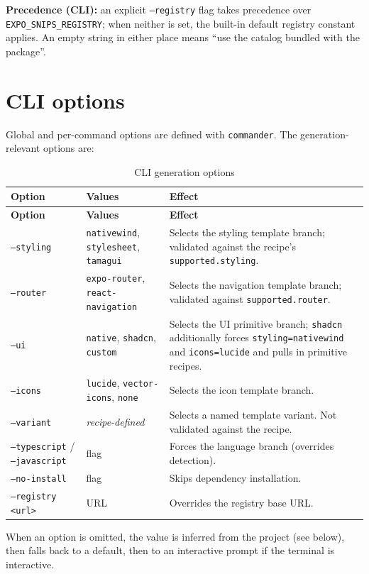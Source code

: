 \textbf{Precedence (CLI):} an explicit \texttt{--registry} flag takes precedence
over \texttt{EXPO\_SNIPS\_REGISTRY}; when neither is set, the built-in default
registry constant applies. An empty string in either place means ``use the
catalog bundled with the package''.

\section{CLI options}

Global and per-command options are defined with \texttt{commander}. The
generation-relevant options are:

\begin{longtable}{@{}L{3.4cm}L{3.4cm}L{6.8cm}@{}}
\caption{CLI generation options}\\
\toprule
\textbf{Option} & \textbf{Values} & \textbf{Effect} \\
\midrule
\endfirsthead
\toprule
\textbf{Option} & \textbf{Values} & \textbf{Effect} \\
\midrule
\endhead
\texttt{--styling} & \texttt{nativewind}, \texttt{stylesheet},
\texttt{tamagui} & Selects the styling template branch; validated against the
recipe's \texttt{supported.styling}. \\
\texttt{--router} & \texttt{expo-router}, \texttt{react-navigation} & Selects the
navigation template branch; validated against
\texttt{supported.router}. \\
\texttt{--ui} & \texttt{native}, \texttt{shadcn}, \texttt{custom} & Selects the UI
primitive branch; \texttt{shadcn} additionally forces
\texttt{styling=nativewind} and \texttt{icons=lucide} and pulls in primitive
recipes. \\
\texttt{--icons} & \texttt{lucide}, \texttt{vector-icons}, \texttt{none} &
Selects the icon template branch. \\
\texttt{--variant} & \textit{recipe-defined} & Selects a named template variant.
Not validated against the recipe. \\
\texttt{--typescript} / \texttt{--javascript} & flag & Forces the language branch
(overrides detection). \\
\texttt{--no-install} & flag & Skips dependency installation. \\
\texttt{--registry <url>} & URL & Overrides the registry base URL. \\
\bottomrule
\end{longtable}

When an option is omitted, the value is inferred from the project (see below),
then falls back to a default, then to an interactive prompt if the terminal is
interactive.

